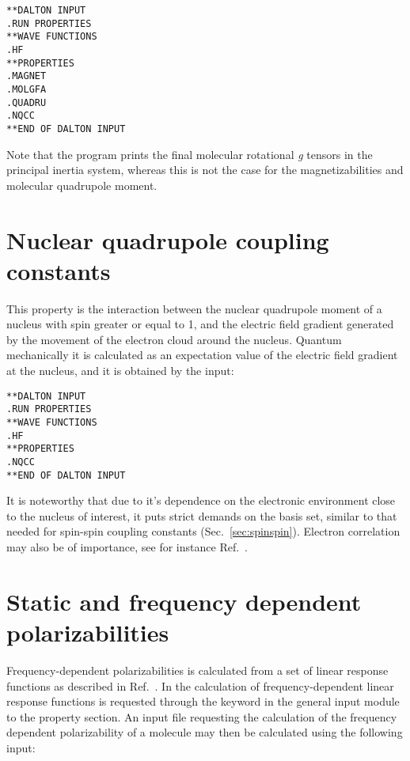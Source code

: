 \begin{verbatim}
**DALTON INPUT
.RUN PROPERTIES
**WAVE FUNCTIONS
.HF
**PROPERTIES
.MAGNET
.MOLGFA
.QUADRU
.NQCC
**END OF DALTON INPUT
\end{verbatim}

Note that the program prints the final molecular rotational {\em g}
tensors in the
principal inertia system, whereas this is not the case for the
magnetizabilities and molecular quadrupole moment.

\section{Nuclear quadrupole coupling constants}

This property is the interaction between the nuclear quadrupole moment
of a nucleus with spin greater or equal to 1, and the electric field gradient
generated by the movement of the electron cloud around the nucleus.
Quantum mechanically it is calculated as an expectation value of the electric
field gradient  at the nucleus, and it is obtained by the input:

\begin{verbatim}
**DALTON INPUT
.RUN PROPERTIES
**WAVE FUNCTIONS
.HF
**PROPERTIES
.NQCC
**END OF DALTON INPUT
\end{verbatim}

It is noteworthy that due to it's dependence on the
electronic environment close to the nucleus of interest, it puts strict
demands on the basis set, similar to that needed for spin-spin
coupling
constants (Sec.~\ref{sec:spinspin}). Electron correlation may also be of
importance, see for instance Ref.~\cite{mjssocpjthkrcpl243}.

\section{Static and frequency dependent
polarizabilities}\label{sec:polari}

Frequency-dependent polarizabilities is
calculated from a set of linear
response functions as
described in Ref.~\cite{jopjjcp82}. In {\aba} the
calculation of frequency-dependent linear response functions is
requested through the keyword  in the general input
module to the property section. An input file requesting the calculation of the frequency
dependent polarizability of a molecule may then be calculated using
the following input:

